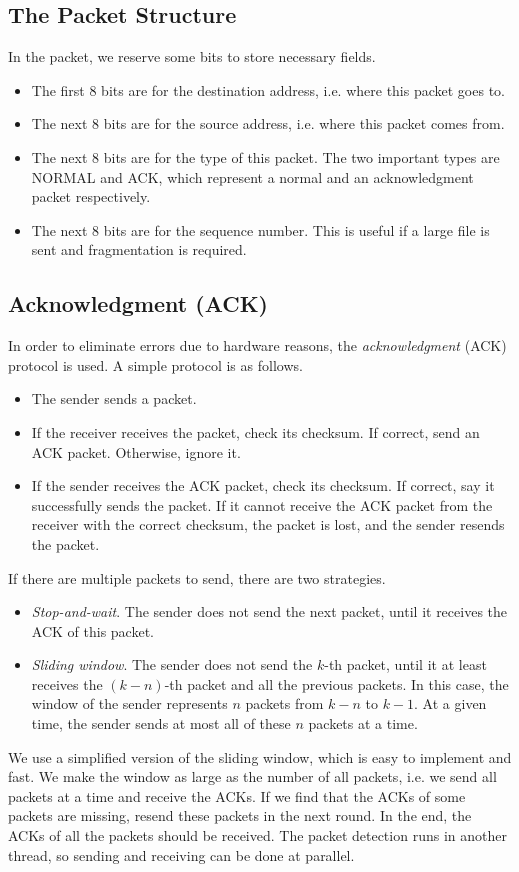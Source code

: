 \documentclass[11pt, conference]{IEEEtran}
\begin{document}
\subsection{The Packet Structure}

In the packet, we reserve some bits to store necessary fields.
\begin{itemize}
\item The first 8 bits are for the destination address, i.e. where this packet goes to.
\item The next 8 bits are for the source address, i.e. where this packet comes from.
\item The next 8 bits are for the type of this packet. The two important types are \textsf{NORMAL} and \textsf{ACK}, which represent a normal and an acknowledgment packet respectively.
\item The next 8 bits are for the sequence number. This is useful if a large file is sent and fragmentation is required.
\end{itemize}

\subsection{Acknowledgment (ACK)}

In order to eliminate errors due to hardware reasons, the \emph{acknowledgment} (ACK) protocol is used. A simple protocol is as follows.
\begin{itemize}
\item The sender sends a packet.
\item If the receiver receives the packet, check its checksum. If correct, send an ACK packet. Otherwise, ignore it.
\item If the sender receives the ACK packet, check its checksum. If correct, say it successfully sends the packet. If it cannot receive the ACK packet from the receiver with the correct checksum, the packet is lost, and the sender resends the packet.
\end{itemize}
If there are multiple packets to send, there are two strategies.
\begin{itemize}
\item \emph{Stop-and-wait}. The sender does not send the next packet, until it receives the ACK of this packet.
\item \emph{Sliding window}. The sender does not send the $k$-th packet, until it at least receives the $(k-n)$-th packet and all the previous packets. In this case, the window of the sender represents $n$ packets from $k-n$ to $k-1$. At a given time, the sender sends at most all of these $n$ packets at a time.
\end{itemize}
We use a simplified version of the sliding window, which is easy to implement and fast. We make the window as large as the number of all packets, i.e. we send all packets at a time and receive the ACKs. If we find that the ACKs of some packets are missing, resend these packets in the next round. In the end, the ACKs of all the packets should be received. The packet detection runs in another thread, so sending and receiving can be done at parallel.
\end{document}
